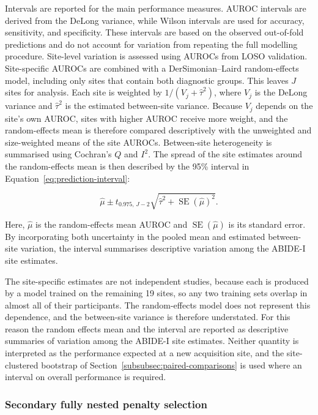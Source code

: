 Intervals are reported for the main performance measures. AUROC intervals are derived from the DeLong variance, while Wilson intervals are used for accuracy, sensitivity, and specificity. These intervals are based on the observed out-of-fold predictions and do not account for variation from repeating the full modelling procedure. Site-level variation is assessed using AUROCs from LOSO validation. Site-specific AUROCs are combined with a DerSimonian--Laird random-effects model, including only sites that contain both diagnostic groups. This leaves $J$ sites for analysis. Each site is weighted by $1/(V_j+\hat{\tau}^2)$, where $V_j$ is the DeLong variance and $\hat{\tau}^2$ is the estimated between-site variance. Because $V_j$ depends on the site's own AUROC, sites with higher AUROC receive more weight, and the random-effects mean is therefore compared descriptively with the unweighted and size-weighted means of the site AUROCs. Between-site heterogeneity is summarised using Cochran's $Q$ and $I^2$. The spread of the site estimates around the random-effects mean is then described by the 95\% interval in Equation~\eqref{eq:prediction-interval}:

\begin{equation}
\hat{\mu}
\pm
t_{0.975,\,J-2}
\sqrt{\hat{\tau}^2+\operatorname{SE}(\hat{\mu})^2}.
\label{eq:prediction-interval}
\end{equation}

Here, $\hat{\mu}$ is the random-effects mean AUROC and
$\operatorname{SE}(\hat{\mu})$ is its standard error. By incorporating both uncertainty in
the pooled mean and estimated between-site variation, the interval summarises descriptive variation among the ABIDE-I site estimates.

The site-specific estimates are not independent studies, because each is produced by a model
trained on the remaining 19 sites, so any two training sets overlap in almost all of their
participants. The random-effects model does not represent this dependence, and the
between-site variance is therefore understated. For this reason the random effects mean and
the interval are reported as descriptive summaries of variation among the ABIDE-I site
estimates. Neither quantity is interpreted as the performance expected at a new acquisition
site, and the site-clustered bootstrap of Section~\ref{subsubsec:paired-comparisons} is used
where an interval on overall performance is required.



\subsubsection{Secondary fully nested penalty selection}
\label{subsubsec:nested-penalty}


